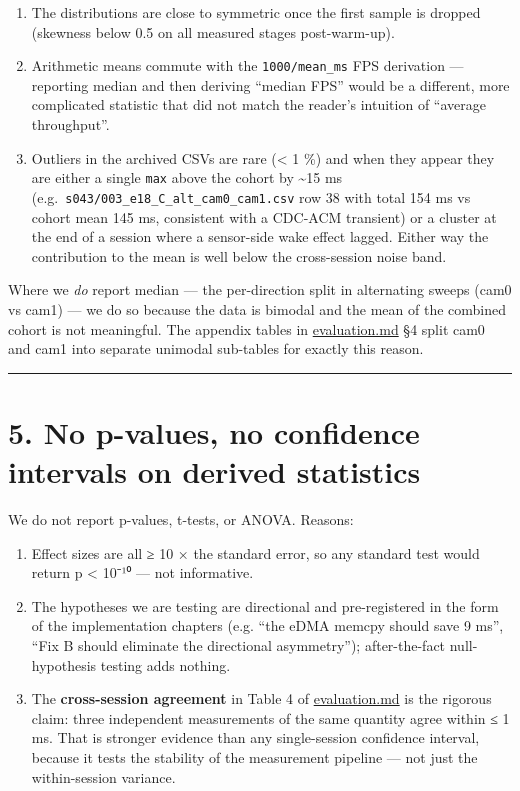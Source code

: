 \begin{enumerate}
\def\labelenumi{\arabic{enumi}.}
\tightlist
\item
  The distributions are close to symmetric once the first sample is
  dropped (skewness below 0.5 on all measured stages post-warm-up).
\item
  Arithmetic means commute with the \texttt{1000/mean\_ms} FPS
  derivation --- reporting median and then deriving ``median FPS'' would
  be a different, more complicated statistic that did not match the
  reader's intuition of ``average throughput''.
\item
  Outliers in the archived CSVs are rare (\textless{} 1 \%) and when
  they appear they are either a single \texttt{max} above the cohort by
  \textasciitilde15 ms
  (e.g.~\texttt{s043/003\_e18\_C\_alt\_cam0\_cam1.csv} row 38 with total
  154 ms vs cohort mean 145 ms, consistent with a CDC-ACM transient) or
  a cluster at the end of a session where a sensor-side wake effect
  lagged. Either way the contribution to the mean is well below the
  cross-session noise band.
\end{enumerate}

Where we \emph{do} report median --- the per-direction split in
alternating sweeps (cam0 vs cam1) --- we do so because the data is
bimodal and the mean of the combined cohort is not meaningful. The
appendix tables in \url{evaluation.md} §4 split cam0 and cam1 into
separate unimodal sub-tables for exactly this reason.

\begin{center}\rule{0.5\linewidth}{0.5pt}\end{center}

\section{5. No p-values, no confidence intervals on derived
statistics}\label{no-p-values-no-confidence-intervals-on-derived-statistics}

We do not report p-values, t-tests, or ANOVA. Reasons:

\begin{enumerate}
\def\labelenumi{\arabic{enumi}.}
\tightlist
\item
  Effect sizes are all ≥ 10 × the standard error, so any standard test
  would return p \textless{} 10⁻¹⁰ --- not informative.
\item
  The hypotheses we are testing are directional and pre-registered in
  the form of the implementation chapters (e.g. ``the eDMA memcpy should
  save 9 ms'', ``Fix B should eliminate the directional asymmetry'');
  after-the-fact null-hypothesis testing adds nothing.
\item
  The \textbf{cross-session agreement} in Table 4 of \url{evaluation.md}
  is the rigorous claim: three independent measurements of the same
  quantity agree within ≤ 1 ms. That is stronger evidence than any
  single-session confidence interval, because it tests the stability of
  the measurement pipeline --- not just the within-session variance.
\end{enumerate}

